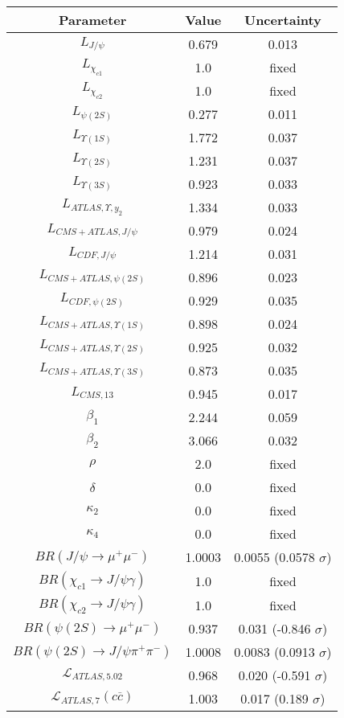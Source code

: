 \begin{table}[h!]
\centering
\begin{tabular}{c|c|c}
Parameter & Value & Uncertainty \\
\hline
$L_{J/\psi}$ & 0.679 & 0.013 \\
$L_{\chi_{c1}}$ & 1.0 & fixed \\
$L_{\chi_{c2}}$ & 1.0 & fixed \\
$L_{\psi(2S)}$ & 0.277 & 0.011 \\
$L_{\Upsilon(1S)}$ & 1.772 & 0.037 \\
$L_{\Upsilon(2S)}$ & 1.231 & 0.037 \\
$L_{\Upsilon(3S)}$ & 0.923 & 0.033 \\
$L_{ATLAS,\Upsilon,y_2}$ & 1.334 & 0.033 \\
$L_{CMS+ATLAS,J/\psi}$ & 0.979 & 0.024 \\
$L_{CDF,J/\psi}$ & 1.214 & 0.031 \\
$L_{CMS+ATLAS,\psi(2S)}$ & 0.896 & 0.023 \\
$L_{CDF,\psi(2S)}$ & 0.929 & 0.035 \\
$L_{CMS+ATLAS,\Upsilon(1S)}$ & 0.898 & 0.024 \\
$L_{CMS+ATLAS,\Upsilon(2S)}$ & 0.925 & 0.032 \\
$L_{CMS+ATLAS,\Upsilon(3S)}$ & 0.873 & 0.035 \\
$L_{CMS,13}$ & 0.945 & 0.017 \\
$\beta_1$ & 2.244 & 0.059 \\
$\beta_2$ & 3.066 & 0.032 \\
$\rho$ & 2.0 & fixed \\
$\delta$ & 0.0 & fixed \\
$\kappa_2$ & 0.0 & fixed \\
$\kappa_4$ & 0.0 & fixed \\
$BR(J/\psi\rightarrow\mu^+\mu^-)$ & 1.0003 & 0.0055 (0.0578 $\sigma$) \\
$BR(\chi_{c1}\rightarrow J/\psi\gamma)$ & 1.0 & fixed \\
$BR(\chi_{c2}\rightarrow J/\psi\gamma)$ & 1.0 & fixed \\
$BR(\psi(2S)\rightarrow\mu^+\mu^-)$ & 0.937 & 0.031 (-0.846 $\sigma$) \\
$BR(\psi(2S)\rightarrow J/\psi\pi^+\pi^-)$ & 1.0008 & 0.0083 (0.0913 $\sigma$) \\
$\mathcal L_{ATLAS,5.02}$ & 0.968 & 0.020 (-0.591 $\sigma$) \\
$\mathcal L_{ATLAS,7}(c\overline c)$ & 1.003 & 0.017 (0.189 $\sigma$) \\

\end{tabular}
\end{table}
